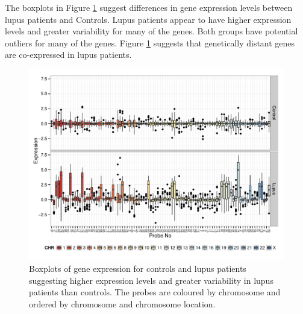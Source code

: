 \documentclass[a4paper, 12pt]{report}
\begin{document}
The boxplots in Figure \ref{F:Box} suggest differences in gene expression levels between lupus patients and \gls{Control}s. \gls{Lupus} patients appear to have higher expression levels and greater variability for many of the genes. Both groups have potential outliers for many of the genes. Figure \ref{F:Box} suggests that genetically distant genes are co-expressed in lupus patients.

\begin{figure}[H]
\begin{centering}
\includegraphics[width=\textwidth]{boxAll.pdf}
\caption{Boxplots of gene expression for controls and lupus patients suggesting higher expression levels and greater variability in lupus patients than controls. The probes are coloured by chromosome and ordered by chromosome and chromosome location.} 
\label{F:Box}
\end{centering}
\end{figure}
\end{document}
